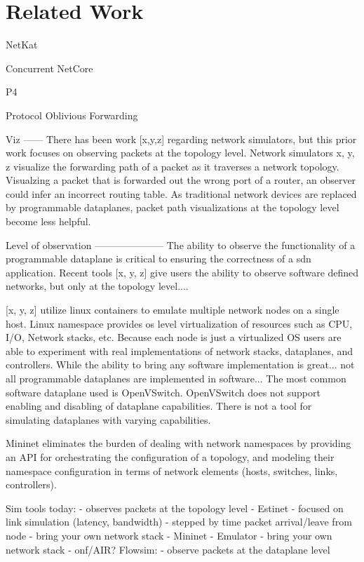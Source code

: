 \section{Related Work}

NetKat\cite{netkat}

Concurrent NetCore\cite{cnetcore}

P4\cite{p4}

Protocol Oblivious Forwarding\cite{pof}



Viz
------
There has been work [x,y,z] regarding network simulators, but this prior work focuses on observing packets at the topology level. Network simulators x, y, z visualize the forwarding path of a packet as it traverses a network topology. Visualzing a packet that is forwarded out the wrong port of a router, an observer could infer an incorrect routing table. As traditional network devices are replaced by programmable dataplanes, packet path visualizations at the topology level become less helpful.

Level of observation
---------------------
The ability to observe the functionality of a programmable dataplane is 
critical to ensuring the correctness of a sdn application. 
Recent tools [x, y, z] give users the ability to observe software defined
networks, but only at the topology level....  

[x, y, z] utilize linux containers to emulate multiple network 
nodes on a single host. Linux namespace provides os level virtualization 
of resources such as CPU, I/O, Network stacks, etc. Because each node is 
just a virtualized OS users are able to experiment with real 
implementations of network stacks, dataplanes, and controllers. While 
the ability to bring any software implementation is great... not all
programmable dataplanes are implemented in software... 
The most common software dataplane used is OpenVSwitch. 
OpenVSwitch does not support enabling and disabling of dataplane capabilities.
There is not a tool for simulating dataplanes with varying capabilities.

Mininet eliminates the burden of dealing with network namespaces 
by providing an API for orchestrating the configuration of a topology, and 
modeling their namespace configuration in terms of network elements (hosts, 
switches, links, controllers). 

Sim tools today:
 - observes packets at the topology level 
 - Estinet
   - focused on link simulation (latency, bandwidth)
   - stepped by time packet arrival/leave from node
   - bring your own network stack 
 - Mininet
   - Emulator
   - bring your own network stack 
 - onf/AIR?
Flowsim:
 - observe packets at the dataplane level
